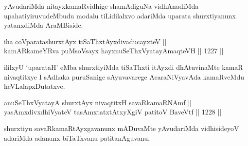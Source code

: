 \begin{artha}
yAvudariMda nitayxkamaRvidhige shamAdiguNa vidhAnadiMda upahatiyiruvudeMbudu modalu tiLidilalxvo adariMda uparata shurxtiyanunx yatanxdiMda AraMBiside.
\end{artha}

\begin{shl}
iha coVparatashurxtAyx \footnotemark[3]tiSaThxtAyxdivaducayxteV || \\
kamARkameYRva puMsoV\s sayx hayxnuSeThxVyatayA\s \s maqteVH ||  1227 ||  
\end{shl}

\begin{artha}
ililxyU `uparataH' eMba shurxtiyiMda tiSaThxti itAyxdi dhAtuvinaMte kamaR nivaqtitxye I sAdhaka puruSanige sAyuvavarege AcaraNiVyavAda kamaRveMdu heVLalapxDutatxve.
\end{artha}


\begin{shl}
anuSeThxVyatayA shurxtAyx nivaqtitxH savaRkamaRNAmf || \\
yasAmxdivxdhiVyateV tasAmxtatxtAtxyXgiV patitoV BaveVtf ||  1228 ||  
\end{shl}

\begin{artha}
shurxtiyu savaRkamaRtAyxgavanunx mADuvaMte yAvudariMda vidhisideyoV adariMda adanunx biTaTxvanu patitanAguvanu.
\end{artha}



